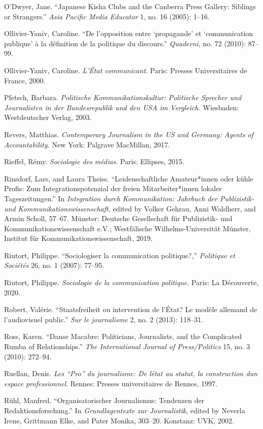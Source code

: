 \documentclass{tufte-handout}
\begin{document}
\begin{hangparas}{.25in}{1}
O'Dwyer, Jane. ``Japanese Kisha Clubs and the Canberra Press Gallery:
Siblings or Strangers.'' \emph{Asia Pacific Media Educator} 1, no. 16
(2005): 1--16.

Ollivier-Yaniv, Caroline. ``De l'opposition entre `propagande' et
`communication publique' à la définition de la politique du discours.''
\emph{Quaderni}, no. 72 (2010): 87--99.

Ollivier-Yaniv, Caroline. \emph{L'État communicant}. Paris: Presses
Universitaires de France, 2000.

Pfetsch, Barbara. \emph{Politische Kommunikationskultur: Politische
Sprecher und Journalisten in der Bundesrepublik und den USA im
Vergleich.} Wiesbaden: Westdeutscher Verlag, 2003.

Revers, Matthias. \emph{Contemporary Journalism in the US and Germany:
Agents of Accountability.} New York: Palgrave MacMillan, 2017.

Rieffel, Rémy. \emph{Sociologie des médias}. Paris: Ellipses, 2015.

Rinsdorf, Lars, and Laura Theiss. ``Leidenschaftliche Amateur*innen oder
kühle Profis: Zum Integrationspotenzial der freien Mitarbeiter*innen
lokaler Tageszeitungen.'' In \emph{Integration durch Kommunikation:
Jahrbuch der Publizistik- und Kommunikationswissenschaft,} edited by
Volker Gehrau, Anni Waldherr, and Armin Scholl, 57--67. Münster:
Deutsche Gesellschaft für Publizistik- und Kommunikationswissenschaft
e.V.; Westfälische Wilhelms-Universität Münster, Institut für
Kommunikationswissenschaft, 2019.

Riutort, Philippe. ``Sociologiser la communication politique?,''
\emph{Politique et Sociétés} 26, no. 1 (2007): 77--95.

Riutort, Philippe. \emph{Sociologie de la communication politique}.
Paris: La Découverte, 2020.

Robert, Valérie. ``Staatsfreiheit ou intervention de l'État? Le modèle
allemand de l'audiovisuel public.'' \emph{Sur le journalisme} 2, no. 2
(2013): 118--31.

Ross, Karen. ``Danse Macabre: Politicians, Journalists, and the
Complicated Rumba of Relationships.'' \emph{The International Journal of
Press/Politics} 15, no. 3 (2010): 272--94.

Ruellan, Denis. \emph{Les ``Pro'' du journalisme: De
l\textquotesingle état au statut, la construction d\textquotesingle un
espace professionnel}. Rennes: Presses universitaires de Rennes, 1997.

Rühl, Manfred. ``Organisatorischer Journalismus: Tendenzen der
Redaktionsforschung.'' In \emph{Grundlagentexte zur Journalistik},
edited by Neverla Irene, Grittmann Elke, and Pater Monika, 303--20.
Konstanz: UVK, 2002.


\end{hangparas}
\end{document}

